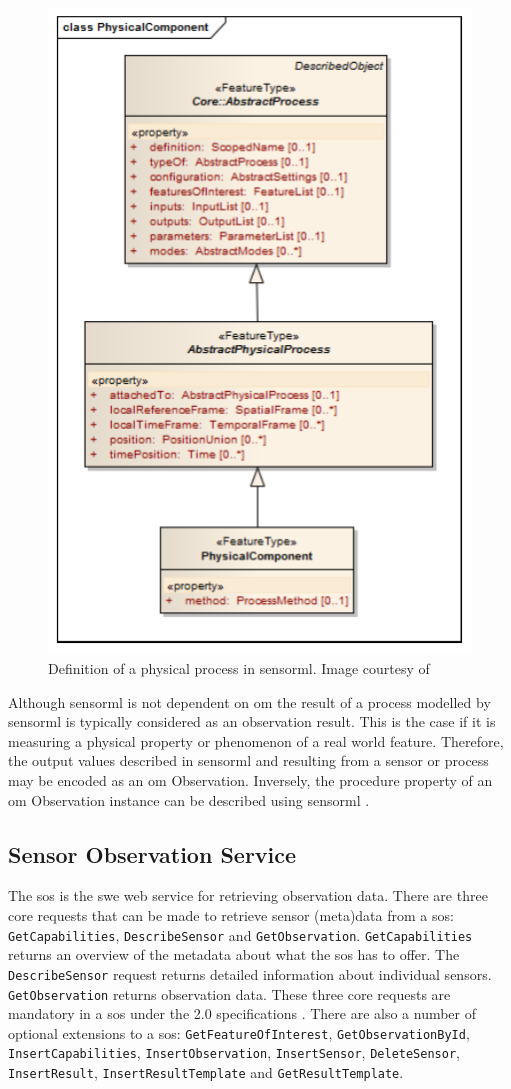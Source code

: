 \begin{figure}
	\centering
	\includegraphics[width=0.6\linewidth]{UML/physicalProcess.png}
	\caption{Definition of a physical process in \ac{sensorml}. Image courtesy of \cite[p. 57]{SW:OGC7}}
	\label{fig:physicalProcess}
\end{figure}

Although \ac{sensorml} is not dependent on \ac{om} the result of a process modelled by \ac{sensorml} is typically considered as an observation result. This is the case if it is measuring a physical property or phenomenon of a real world feature. Therefore, the output values described in \ac{sensorml} and resulting from a sensor or process may be encoded as an \ac{om} Observation. Inversely, the procedure property of an \ac{om} Observation instance can be described using \ac{sensorml} \citep{SW:OGC7}.

\subsection{Sensor Observation Service}
\label{par:sos}
\begin{sloppypar}
	The \acf{sos} is the \ac{swe} web service for retrieving observation data. There are three core requests that can be made to retrieve sensor (meta)data from a \ac{sos}: \texttt{GetCapabilities}, \texttt{DescribeSensor} and \texttt{GetObservation}. \texttt{GetCapabilities} returns an overview of the metadata about what the \ac{sos} has to offer. The \texttt{DescribeSensor} request returns detailed information about individual sensors. \texttt{GetObservation} returns observation data. These three core requests are mandatory in a \ac{sos} under the 2.0 specifications \citep{SW:OGC2}. There are also a number of optional extensions to a \ac{sos}: \texttt{GetFeatureOfInterest}, \texttt{GetObservationById}, \texttt{InsertCapabilities}, \texttt{InsertObservation}, \texttt{InsertSensor}, \texttt{DeleteSensor}, \texttt{InsertResult}, \texttt{InsertResultTemplate} and \texttt{GetResultTemplate}. 
\end{sloppypar}

